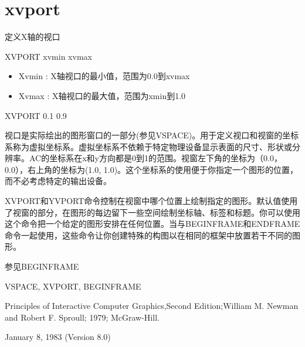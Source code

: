 \section{xvport}
\label{cmd:xvport}

定义X轴的视口

XVPORT xvmin xvmax

\begin{itemize}
\item Xvmin : X轴视口的最小值，范围为0.0到xvmax 
\item Xvmax : X轴视口的最大值，范围为xmin到1.0 
\end{itemize}

XVPORT 0.1 0.9

视口是实际绘出的图形窗口的一部分(参见VSPACE)。用于定义视口和视窗的坐标系称为虚拟坐标系。虚拟坐标系不依赖于特定物理设备显示表面的尺寸、形状或分辨率。AC的坐标系在x和y方向都是0到1的范围。视窗左下角的坐标为（0.0，0.0），右上角的坐标为(1.0, 1.0)。这个坐标系的使用便于你指定一个图形的位置，而不必考虑特定的输出设备。

XVPORT和YVPORT命令控制在视窗中哪个位置上绘制指定的图形。默认值使用了视窗的部分，在图形的每边留下一些空间绘制坐标轴、标签和标题。你可以使用这个命令把一个给定的图形安排在任何位置。当与BEGINFRAME和ENDFRAME命令一起使用，这些命令让你创建特殊的构图以在相同的框架中放置若干不同的图形。

参见BEGINFRAME

VSPACE, XVPORT, BEGINFRAME

Principles of Interactive Computer Graphics,Second Edition;William M. Newman and Robert F. Sproull; 1979; McGraw-Hill.

January 8, 1983 (Version 8.0)


